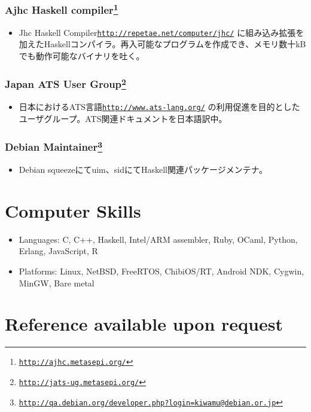 \documentclass[letterpaper]{article}
\begin{document}
\subsubsection*{Ajhc Haskell compiler\footnote{\href{http://ajhc.metasepi.org/}{\tt http://ajhc.metasepi.org/}}}
\begin{itemize}
\item Jhc Haskell Compiler\href{http://repetae.net/computer/jhc/}{\tt http://repetae.net/computer/jhc/} に組み込み拡張を加えたHaskellコンパイラ。再入可能なプログラムを作成でき、メモリ数十kBでも動作可能なバイナリを吐く。
\end{itemize}

\subsubsection*{Japan ATS User Group\footnote{\href{http://jats-ug.metasepi.org/}{\tt http://jats-ug.metasepi.org/}}}
\begin{itemize}
\item 日本におけるATS言語\href{http://www.ats-lang.org/}{\tt http://www.ats-lang.org/} の利用促進を目的としたユーザグループ。ATS関連ドキュメントを日本語訳中。
\end{itemize}

\subsubsection*{Debian Maintainer\footnote{\href{http://qa.debian.org/developer.php?login=kiwamu@debian.or.jp}{\tt http://qa.debian.org/developer.php?login=kiwamu@debian.or.jp}}}
\begin{itemize}
\item Debian squeezeにてuim、sidにてHaskell関連パッケージメンテナ。
\end{itemize}

\section*{Computer Skills}

\begin{itemize}
  \item Languages: C, C++, Haskell, Intel/ARM assembler, Ruby, OCaml, Python, Erlang, JavaScript, R
  \item Platforms: Linux, NetBSD, FreeRTOS, ChibiOS/RT, Android NDK, Cygwin, MinGW, Bare metal
\end{itemize}

\section*{Reference available upon request}
\end{document}
